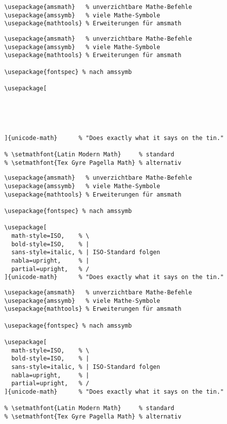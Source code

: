 \newsavebox{\mathfontsone}
\newsavebox{\mathfontstwo}
\newsavebox{\mathfontsthree}
\newsavebox{\mathfontsfour}

\begin{lrbox}{\mathfontsone}
  \begin{lstlisting}
    \usepackage{amsmath}   % unverzichtbare Mathe-Befehle
    \usepackage{amssymb}   % viele Mathe-Symbole
    \usepackage{mathtools} % Erweiterungen für amsmath
  \end{lstlisting}
\end{lrbox}

\begin{lrbox}{\mathfontstwo}
  \begin{lstlisting}
    \usepackage{amsmath}   % unverzichtbare Mathe-Befehle
    \usepackage{amssymb}   % viele Mathe-Symbole
    \usepackage{mathtools} % Erweiterungen für amsmath

    \usepackage{fontspec} % nach amssymb

    \usepackage[





    ]{unicode-math}      % "Does exactly what it says on the tin."

    % \setmathfont{Latin Modern Math}     % standard
    % \setmathfont{Tex Gyre Pagella Math} % alternativ
  \end{lstlisting}
\end{lrbox}

\begin{lrbox}{\mathfontsthree}
  \begin{lstlisting}
    \usepackage{amsmath}   % unverzichtbare Mathe-Befehle
    \usepackage{amssymb}   % viele Mathe-Symbole
    \usepackage{mathtools} % Erweiterungen für amsmath

    \usepackage{fontspec} % nach amssymb

    \usepackage[
      math-style=ISO,    % \
      bold-style=ISO,    % |
      sans-style=italic, % | ISO-Standard folgen
      nabla=upright,     % |
      partial=upright,   % /
    ]{unicode-math}      % "Does exactly what it says on the tin."
  \end{lstlisting}
\end{lrbox}

\begin{lrbox}{\mathfontsfour}
  \begin{lstlisting}
    \usepackage{amsmath}   % unverzichtbare Mathe-Befehle
    \usepackage{amssymb}   % viele Mathe-Symbole
    \usepackage{mathtools} % Erweiterungen für amsmath

    \usepackage{fontspec} % nach amssymb

    \usepackage[
      math-style=ISO,    % \
      bold-style=ISO,    % |
      sans-style=italic, % | ISO-Standard folgen
      nabla=upright,     % |
      partial=upright,   % /
    ]{unicode-math}      % "Does exactly what it says on the tin."

    % \setmathfont{Latin Modern Math}     % standard
    % \setmathfont{Tex Gyre Pagella Math} % alternativ
  \end{lstlisting}
\end{lrbox}

